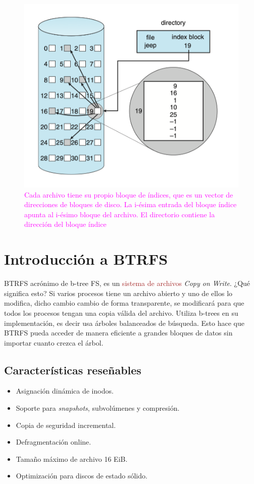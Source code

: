 \begin{figure}[H]
    \centering
    \includegraphics[scale=0.6]{doc/assets/images/Allocation Methods/indexed.png}
    \caption{ \textcolor{magenta}{ Cada archivo tiene su propio bloque de índices, que es un vector de direcciones de bloques de disco. La i-ésima entrada del bloque índice apunta al i-ésimo bloque del archivo. El directorio contiene la dirección del bloque índice \cite{silberchatz}}}
\end{figure}


\section{Introducción a BTRFS}
BTRFS acrónimo de b-tree FS, es un \textcolor{brown}{sistema de archivos} \textit{Copy on Write}. ¿Qué significa esto? Si varios procesos tiene un archivo abierto y uno de ellos lo modifica, dicho cambio cambio de forma transparente, se modificará para que todos los procesos tengan una copia válida del archivo. Utiliza b-trees en su implementación, es decir usa árboles balanceados de búsqueda. Esto hace que BTRFS pueda acceder de manera eficiente a grandes bloques de datos sin importar cuanto crezca el árbol.

\subsection{Características reseñables}
\begin{itemize}
    \item Asignación dinámica de inodos.
    \item Soporte para \textit{snapshots}, subvolúmenes y compresión.
    \item Copia de seguridad incremental.
    \item Defragmentación online.
    \item Tamaño máximo de archivo 16 EiB.
    \item Optimización para discos de estado sólido.
\end{itemize}

